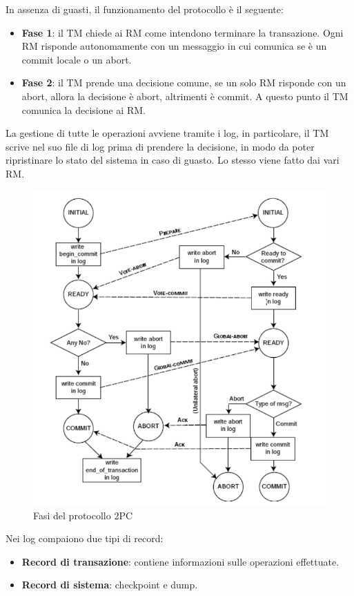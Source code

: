In assenza di guasti, il funzionamento del protocollo è il seguente:
\begin{itemize}
      \item \textbf{Fase 1}: il TM chiede ai RM come intendono terminare la
            transazione. Ogni RM risponde autonomamente con un messaggio in cui
            comunica se è un commit locale o un abort.
      \item \textbf{Fase 2}: il TM prende una decisione comune, se un solo RM
            risponde con un abort, allora la decisione è abort, altrimenti è
            commit. A questo punto il TM comunica la decisione ai RM.
\end{itemize}
La gestione di tutte le operazioni avviene tramite i log, in particolare, il TM
scrive nel suo file di log prima di prendere la decisione,
in modo da poter ripristinare lo stato del sistema in caso di guasto. Lo stesso
viene fatto dai vari RM.
\begin{figure}[!ht]
      \centering
      \includegraphics[width=.5\textwidth]{img/DDBMS/2PC.png}
      \caption{Fasi del protocollo 2PC}
      \label{fig:2PC}
\end{figure}

Nei log compaiono due tipi di record:
\begin{itemize}
      \item \textbf{Record di transazione}: contiene informazioni sulle operazioni
            effettuate.
      \item \textbf{Record di sistema}: checkpoint e dump.
\end{itemize}


